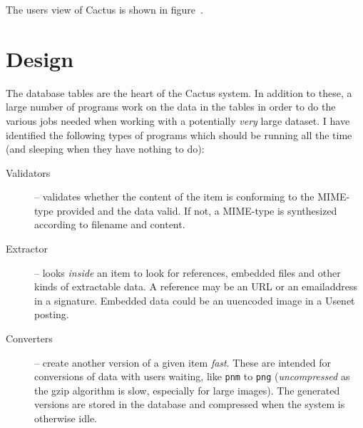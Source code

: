 The users view of Cactus is shown in
figure~.

\section{Design}
\label{sec:cactus-design}

The database tables are the heart of the Cactus system.  In
addition to these, a large number of programs work on the
data in the tables in order to do the various jobs needed
when working with a potentially \textit{very} large dataset.
I have identified the following types of programs which
should be running all the time (and sleeping when they have
nothing to do):

\begin{description}
  
\item[Validators] -- validates whether the content
  of the item is conforming to the MIME-type provided and
  the data valid.  If not, a MIME-type is synthesized
  according to filename and content.

  

  
\item[Extractor] -- looks \textit{inside} an item to look
  for references, embedded files and other kinds of
  extractable data.  A reference may be an URL or an
  emailaddress in a signature.  Embedded data could be an
  uuencoded image in a Usenet posting.
  
\item[Converters] -- create another version of a given item
  \textit{fast}.  These are intended for conversions of data
  with users waiting, like \texttt{pnm} to
  \texttt{png} (\textit{uncompressed} as the gzip algorithm is slow,
  especially for large images).  The generated
  versions are stored in the database and compressed when
  the system is otherwise idle.

  

\end{description}
